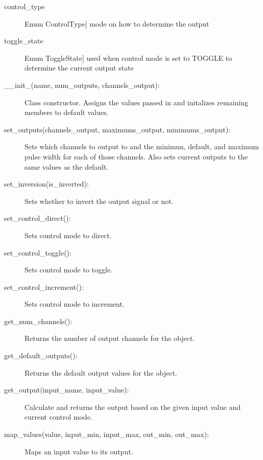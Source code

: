 \documentclass[letterpaper,10pt,english]{sphinxmanual}
\begin{document}
\begin{fulllineitems}
\begin{description}
\item[{control\_type}] \leavevmode{[}Enum ControlType{]}
\sphinxAtStartPar
mode on how to determine the output

\item[{toggle\_state}] \leavevmode{[}Enum ToggleState{]}
\sphinxAtStartPar
used when control mode is set to TOGGLE to determine the current output state

\end{description}
\begin{description}
\item[{\_\_init\_(name, num\_outputs, channels\_output):}] \leavevmode
\sphinxAtStartPar
Class constructor. Assigns the values passed in and initalizes remaining members to default values.

\item[{set\_outputs(channels\_output, maximums\_output, minimums\_output):}] \leavevmode
\sphinxAtStartPar
Sets which channels to output to and the minimun, default, and maximum pulse width for each of those channels.
Also sets current outputs to the same values as the default.

\item[{set\_inversion(is\_inverted):}] \leavevmode
\sphinxAtStartPar
Sets whether to invert the output signal or not.

\item[{set\_control\_direct():}] \leavevmode
\sphinxAtStartPar
Sets control mode to direct.

\item[{set\_control\_toggle():}] \leavevmode
\sphinxAtStartPar
Sets control mode to toggle.

\item[{set\_control\_increment():}] \leavevmode
\sphinxAtStartPar
Sets control mode to increment.

\item[{get\_num\_channels():}] \leavevmode
\sphinxAtStartPar
Returns the number of output channels for the object.

\item[{get\_default\_outputs():}] \leavevmode
\sphinxAtStartPar
Returns the default output values for the object.

\item[{get\_output(input\_name, input\_value):}] \leavevmode
\sphinxAtStartPar
Calculate and returns the output based on the given input value and current control mode.

\item[{map\_values(value, input\_min, input\_max, out\_min, out\_max):}] \leavevmode
\sphinxAtStartPar
Maps an input value to its output.


\end{description}
\end{fulllineitems}
\end{document}
